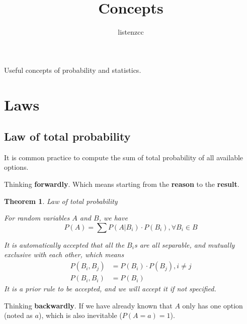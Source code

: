 

\newtheorem{theorem}{Theorem}[section]
\newtheorem{lemma}{Lemma}[section]
\newtheorem{proposition}{Proposition}[section]

\title{Concepts}
\author{listenzcc}



\maketitle

\abstract
Useful concepts of probability and statistics.

\tableofcontents

\section{Laws}

\subsection{Law of total probability}

It is common practice to compute the sum of total probability of all available options.

Thinking \textbf{forwardly}.
Which means starting from the \textbf{reason} to the \textbf{result}.

\begin{theorem}
    \label{Theroem: Law of total probability}
    Law of total probability

    For random variables $A$ and $B$, we have
    \begin{equation*}
        P(A) = \sum {P(A|B_i) \cdot P(B_i)}, \forall B_i \in B
    \end{equation*}

    It is automatically accepted that all the $B_i$s are all separable, and mutually exclusive with each other, which means
    \begin{align*}
        P(B_i, B_j) & = P(B_i) \cdot P(B_j), i \neq j \\
        P(B_i, B_i) & = P(B_i)
    \end{align*}
    It is a prior rule to be accepted, and we will accept it if not specified.
\end{theorem}

Thinking \textbf{backwardly}.
If we have already known that $A$ only has one option (noted as $a$), which is also inevitable ($P(A=a) = 1$).

